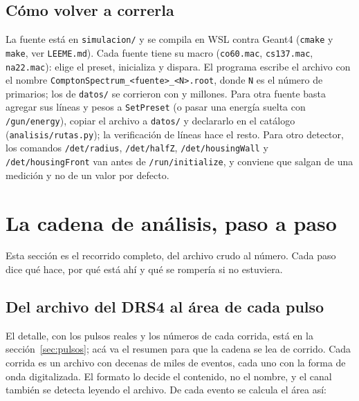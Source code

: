\documentclass[11pt,a4paper]{article}
\begin{document}
\subsection{Cómo volver a correrla}

La fuente está en \texttt{simulacion/} y se compila en WSL contra Geant4
\SimVersion{} (\texttt{cmake} y \texttt{make}, ver \texttt{LEEME.md}). Cada
fuente tiene su macro (\texttt{co60.mac}, \texttt{cs137.mac},
\texttt{na22.mac}): elige el preset, inicializa y dispara. El programa
escribe el archivo con el nombre \texttt{ComptonSpectrum\_<fuente>\_<N>.root},
donde \texttt{N} es el número de primarios; los de \texttt{datos/} se corrieron
con \SimPrimariosCo{} y \SimPrimariosCs{} millones. Para otra fuente basta
agregar sus líneas y pesos a \texttt{SetPreset} (o pasar una energía suelta
con \texttt{/gun/energy}), copiar el archivo a \texttt{datos/} y declararlo
en el catálogo (\texttt{analisis/rutas.py}); la verificación de líneas hace el
resto. Para otro detector, los comandos \texttt{/det/radius},
\texttt{/det/halfZ}, \texttt{/det/housingWall} y \texttt{/det/housingFront}
van antes de \texttt{/run/initialize}, y conviene que salgan de una medición
y no de un valor por defecto.

\section{La cadena de análisis, paso a paso}
\label{sec:cadena}

Esta sección es el recorrido completo, del archivo crudo al número. Cada paso
dice qué hace, por qué está ahí y qué se rompería si no estuviera.

\subsection{Del archivo del DRS4 al área de cada pulso}

El detalle, con los pulsos reales y los números de cada corrida, está en la
sección~\ref{sec:pulsos}; acá va el resumen para que la cadena se lea de
corrido. Cada corrida es un archivo con decenas de miles de eventos, cada uno
con la forma de onda digitalizada. El formato lo decide el contenido, no el
nombre, y el canal también se detecta leyendo el archivo. De cada evento se
calcula el área así:
\end{document}
